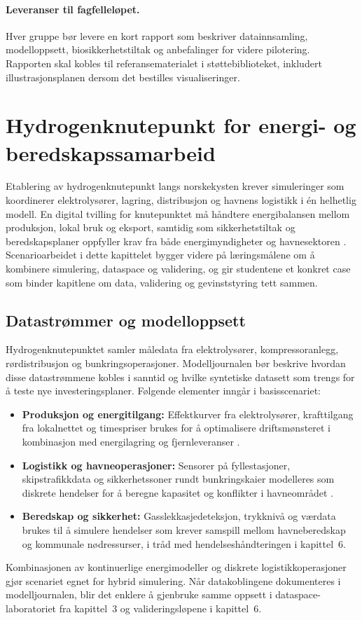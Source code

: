 \paragraph{Leveranser til fagfelleløpet.} Hver gruppe bør levere en kort rapport som beskriver datainnsamling, modelloppsett, biosikkerhetstiltak og anbefalinger for videre pilotering. Rapporten skal kobles til referansematerialet i støttebiblioteket, inkludert illustrasjonsplanen dersom det bestilles visualiseringer.

\section{Hydrogenknutepunkt for energi- og beredskapssamarbeid}
Etablering av hydrogenknutepunkt langs norskekysten krever simuleringer som koordinerer elektrolysører, lagring, distribusjon og havnens logistikk i én helhetlig modell. En digital tvilling for knutepunktet må håndtere energibalansen mellom produksjon, lokal bruk og eksport, samtidig som sikkerhetstiltak og beredskapsplaner oppfyller krav fra både energimyndigheter og havnesektoren \citep{enova2024hydrogenknutepunkt,gassco2023hydrogen}. Scenarioarbeidet i dette kapittelet bygger videre på læringsmålene om å kombinere simulering, dataspace og validering, og gir studentene et konkret case som binder kapitlene om data, validering og gevinststyring tett sammen.

\subsection{Datastrømmer og modelloppsett}
Hydrogenknutepunktet samler måledata fra elektrolysører, kompressoranlegg, rørdistribusjon og bunkringsoperasjoner. Modelljournalen bør beskrive hvordan disse datastrømmene kobles i sanntid og hvilke syntetiske datasett som trengs for å teste nye investeringsplaner. Følgende elementer inngår i basisscenariet:
\begin{itemize}
    \item \textbf{Produksjon og energitilgang:} Effektkurver fra elektrolysører, krafttilgang fra lokalnettet og timespriser brukes for å optimalisere driftsmønsteret i kombinasjon med energilagring og fjernleveranser \citep{dnv2023hydrogenforecast}.
    \item \textbf{Logistikk og havneoperasjoner:} Sensorer på fyllestasjoner, skipstrafikkdata og sikkerhetssoner rundt bunkringskaier modelleres som diskrete hendelser for å beregne kapasitet og konflikter i havneområdet \citep{heroya2024hydrogenhub}.
    \item \textbf{Beredskap og sikkerhet:} Gasslekkasjedeteksjon, trykknivå og værdata brukes til å simulere hendelser som krever samspill mellom havneberedskap og kommunale nødressurser, i tråd med hendelseshåndteringen i kapittel~6.
\end{itemize}
Kombinasjonen av kontinuerlige energimodeller og diskrete logistikkoperasjoner gjør scenariet egnet for hybrid simulering. Når datakoblingene dokumenteres i modelljournalen, blir det enklere å gjenbruke samme oppsett i dataspace-laboratoriet fra kapittel~3 og valideringsløpene i kapittel~6.

